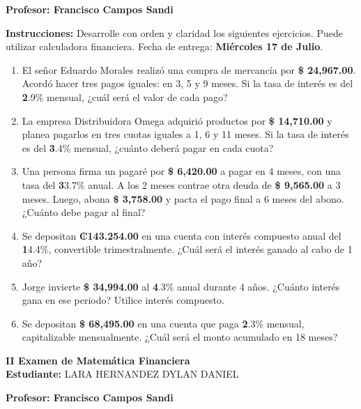 \documentclass[14pt]{article}
\begin{document}
\textbf{Profesor: Francisco Campos Sandi}

\textbf{Instrucciones:} Desarrolle con orden y claridad los siguientes ejercicios. Puede utilizar calculadora financiera. Fecha de entrega: \textbf{Miércoles 17 de Julio}.

\begin{enumerate}
  \item El señor Eduardo Morales realizó una compra de mercancía por \textbf{\$ 24,967.00}. Acordó hacer tres pagos iguales: en 3, 5 y 9 meses. Si la tasa de interés es del \textbf2.9\% mensual, ¿cuál será el valor de cada pago?

  \item La empresa Distribuidora Omega adquirió productos por \textbf{\$ 14,710.00} y planea pagarlos en tres cuotas iguales a 1, 6 y 11 meses. Si la tasa de interés es del \textbf3.4\% mensual, ¿cuánto deberá pagar en cada cuota?

  \item Una persona firma un pagaré por \textbf{\$ 6,420.00} a pagar en 4 meses, con una tasa del \textbf33.7\% anual. A los 2 meses contrae otra deuda de \textbf{\$ 9,565.00} a 3 meses. Luego, abona \textbf{\$ 3,758.00} y pacta el pago final a 6 meses del abono. ¿Cuánto debe pagar al final?

  \item Se depositan \textbf{₡143.254.00} en una cuenta con interés compuesto anual del \textbf14.4\%, convertible trimestralmente. ¿Cuál será el interés ganado al cabo de 1 año?

  \item Jorge invierte \textbf{\$ 34,994.00} al \textbf4.3\% anual durante 4 años. ¿Cuánto interés gana en ese periodo? Utilice interés compuesto.

  \item Se depositan \textbf{\$ 68,495.00} en una cuenta que paga \textbf2.3\% mensual, capitalizable mensualmente. ¿Cuál será el monto acumulado en 18 meses?
\end{enumerate}
\newpage

\begin{center}
    {\LARGE \textbf{II Examen de Matemática Financiera}}\\[1em]
    {\large \textbf{Estudiante:} LARA HERNANDEZ DYLAN DANIEL}
\end{center}

\vspace{1cm}

\textbf{Profesor: Francisco Campos Sandi}
\end{document}

